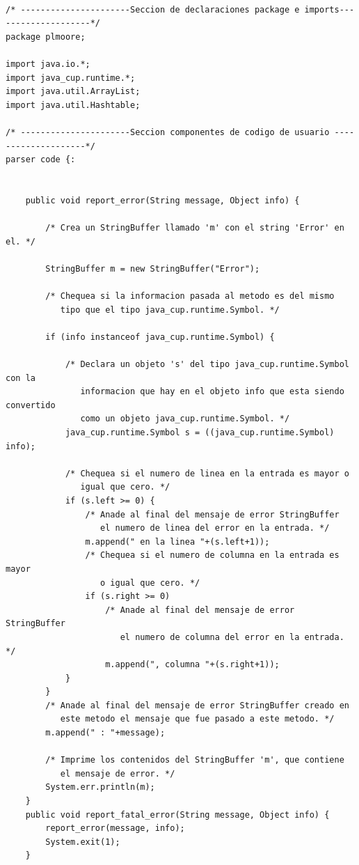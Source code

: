 \documentclass[12pt,a4paper]{article}
\begin{document}
\begin{lstlisting}[caption=Analizador Sintáctico y Semántico en CUP]

/* ----------------------Seccion de declaraciones package e imports--------------------*/
package plmoore;

import java.io.*;
import java_cup.runtime.*;
import java.util.ArrayList;
import java.util.Hashtable;

/* ----------------------Seccion componentes de codigo de usuario --------------------*/
parser code {:


	public void report_error(String message, Object info) {
   
        /* Crea un StringBuffer llamado 'm' con el string 'Error' en el. */

        StringBuffer m = new StringBuffer("Error");
   
        /* Chequea si la informacion pasada al metodo es del mismo
           tipo que el tipo java_cup.runtime.Symbol. */

        if (info instanceof java_cup.runtime.Symbol) {

            /* Declara un objeto 's' del tipo java_cup.runtime.Symbol con la
               informacion que hay en el objeto info que esta siendo convertido
               como un objeto java_cup.runtime.Symbol. */
            java_cup.runtime.Symbol s = ((java_cup.runtime.Symbol) info);
   
            /* Chequea si el numero de linea en la entrada es mayor o
               igual que cero. */
            if (s.left >= 0) {                
                /* Anade al final del mensaje de error StringBuffer
                   el numero de linea del error en la entrada. */
                m.append(" en la linea "+(s.left+1));   
                /* Chequea si el numero de columna en la entrada es mayor
                   o igual que cero. */
                if (s.right >= 0)                    
                    /* Anade al final del mensaje de error StringBuffer
                       el numero de columna del error en la entrada. */
                    m.append(", columna "+(s.right+1));
            }
        }
        /* Anade al final del mensaje de error StringBuffer creado en
           este metodo el mensaje que fue pasado a este metodo. */
        m.append(" : "+message);
   
        /* Imprime los contenidos del StringBuffer 'm', que contiene
           el mensaje de error. */
        System.err.println(m);
    }
    public void report_fatal_error(String message, Object info) {
        report_error(message, info);
        System.exit(1);
    }


\end{lstlisting}
\end{document}
